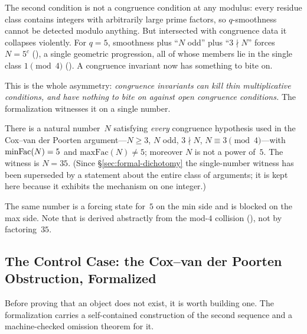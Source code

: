 The second condition is not a congruence condition at any modulus:
every residue class contains integers with arbitrarily large prime
factors, so $q$-smoothness cannot be detected modulo anything.  But
intersected with congruence data it collapses violently.  For $q = 5$,
smoothness plus ``$N$ odd'' plus ``$3 \nmid N$'' forces
$N = 5^c$ (),
a single geometric progression, all of whose members lie in the single
class $1 \pmod 4$
().
A congruence invariant now has something to bite on.

This is the whole asymmetry: \emph{congruence invariants can kill thin
multiplicative conditions, and have nothing to bite on against open
congruence conditions.}  The formalization witnesses it on a single
number.

\begin{theorem}
\label{thm:asymmetry-witness}
There is a natural number~$N$ satisfying \emph{every} congruence
hypothesis used in the Cox--van der Poorten argument---$N \geq 3$,
$N$ odd, $3 \nmid N$, $N \equiv 3 \pmod 4$---with
$\mathrm{minFac}(N) = 5$ and $\mathrm{maxFac}(N) \neq 5$; moreover $N$ is not a
power of~$5$.  The witness is $N = 35$.  (Since
\S\ref{sec:formal-dichotomy} the single-number witness has been superseded by
a statement about the entire class of arguments; it is kept here because it
exhibits the mechanism on one integer.)
\end{theorem}

\noindent
The same number is a forcing state for~$5$ on the min side and is
blocked on the max side.  Note that
is derived abstractly from the mod-$4$ collision
(),
not by factoring~$35$.

\subsection{The Control Case: the Cox--van der Poorten Obstruction, Formalized}
\label{sec:cvdp-control}

Before proving that an object does not exist, it is worth building one.
The formalization carries a self-contained construction of the second
sequence and a machine-checked omission theorem for it.


